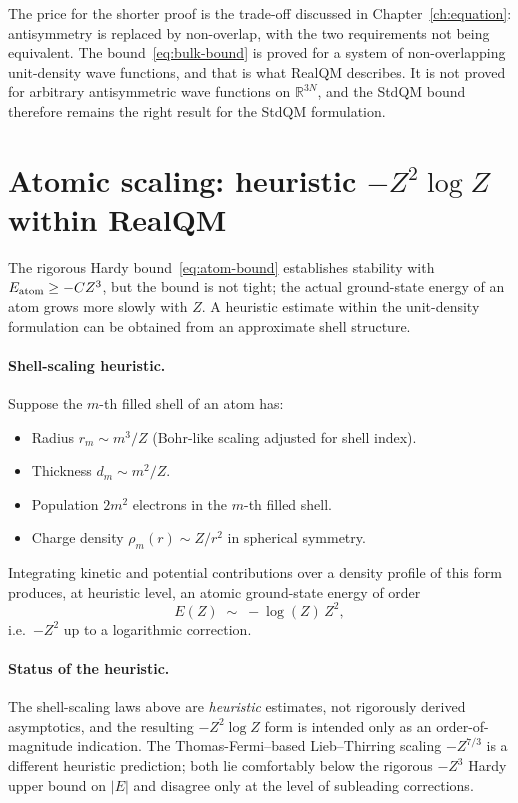 The price for the shorter proof is the trade-off discussed in Chapter~\ref{ch:equation}: antisymmetry is replaced by non-overlap, with the two requirements not being equivalent. The bound~\eqref{eq:bulk-bound} is proved for a system of non-overlapping unit-density wave functions, and that is what RealQM describes. It is not proved for arbitrary antisymmetric wave functions on $\mathbb{R}^{3N}$, and the StdQM bound therefore remains the right result for the StdQM formulation.

\section{Atomic scaling: heuristic $-Z^2 \log Z$ within RealQM}\label{sec:atom-scaling}

The rigorous Hardy bound~\eqref{eq:atom-bound} establishes stability with $E_{\rm atom} \ge -CZ^3$, but the bound is not tight; the actual ground-state energy of an atom grows more slowly with $Z$. A heuristic estimate within the unit-density formulation can be obtained from an approximate shell structure.

\paragraph{Shell-scaling heuristic.}
Suppose the $m$-th filled shell of an atom has:
\begin{itemize}
\item Radius $r_m \sim m^3 / Z$ (Bohr-like scaling adjusted for shell index).
\item Thickness $d_m \sim m^2 / Z$.
\item Population $2m^2$ electrons in the $m$-th filled shell.
\item Charge density $\rho_m(r) \sim Z / r^2$ in spherical symmetry.
\end{itemize}
Integrating kinetic and potential contributions over a density profile of this form produces, at heuristic level, an atomic ground-state energy of order
\begin{equation}\label{eq:heuristic-scaling}
E(Z) \;\sim\; -\log(Z)\, Z^2,
\end{equation}
i.e.\ $-Z^2$ up to a logarithmic correction.

\paragraph{Status of the heuristic.}
The shell-scaling laws above are \emph{heuristic} estimates, not rigorously derived asymptotics, and the resulting $-Z^2 \log Z$ form is intended only as an order-of-magnitude indication. The Thomas-Fermi--based Lieb--Thirring scaling $-Z^{7/3}$ is a different heuristic prediction; both lie comfortably below the rigorous $-Z^3$ Hardy upper bound on $|E|$ and disagree only at the level of subleading corrections.

